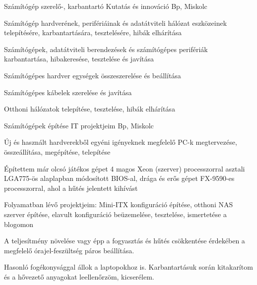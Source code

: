 

\begin{cventries}

  \cventry
    {Számítógép szerelő-, karbantartó} %
    {Kutatás és innováció} %
    {Bp, Miskolc} %
    {} %
    {
      \begin{cvitems} %
        \item {Számítógép hardverének, perifériáinak és adatátviteli hálózat eszközeinek telepítésére, karbantartására, tesztelésére, hibák elhárítása}
        \item {Számítógépek, adatátviteli berendezések és számítógépes perifériák karbantartása, hibakeresése, tesztelése és javítása}
        \item {Számítógépes hardver egységek összeszerelése és beállítása}
        \item {Számítógépes kábelek szerelése és javítása}
        \item {Otthoni hálózatok telepítése, tesztelése, hibák elhárítása}
      \end{cvitems}
    }

  \cventry
    {Számítógépek építése} %
    {IT projektjeim} %
    {Bp, Miskolc} %
    {} %
    {
      \begin{cvitems} %
        \item {Új és használt hardverekből egyéni igényeknek megfelelő PC-k megtervezése, összeállítása, megépítése, telepítése}
        \item {Építettem már olcsó játékos gépet 4 magos Xeon (szerver) processzorral asztali LGA775-ös alaplapban módosított BIOS-al, drága és erős gépet FX-9590-es processzorral, ahol a hűtés jelentett kihívást}
        \item {Folyamatban lévő projektjeim: Mini-ITX konfiguráció építése, otthoni NAS szerver építése, elavult konfiguráció beüzemelése, tesztelése, ismertetése a blogomon}
        \item{A teljesítmény növelése vagy épp a fogyasztás és hűtés csökkentése érdekében a megfelelő órajel-feszültség páros beállítása.}
        \item {Hasonló fogékonysággal állok a laptopokhoz is. Karbantartásuk
        	során kitakarítom és a hővezető anyagokat leellenőrzöm, kicserélem.}
      \end{cvitems}
    }


\end{cventries}
